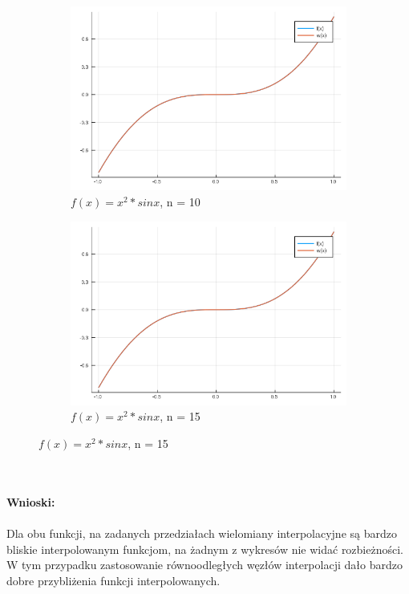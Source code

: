 \documentclass{article}
\begin{document}
\begin{figure}[ht]
	\begin{subfigure}{.5\textwidth}
		\centering
		\includegraphics[width=.8\linewidth]{plots/5_5.png}  
		\caption*{$f(x) = x^2*sinx$, n = 10}
	\end{subfigure}
	\begin{subfigure}{.5\textwidth}
		\centering
		\includegraphics[width=.8\linewidth]{plots/5_6.png}  
		\caption*{$f(x) = x^2*sinx$, n = 15}
	\end{subfigure}
\end{figure}\\\\
\newpage
\noindent \textbf{Wnioski: } \\\\
Dla obu funkcji, na zadanych przedziałach wielomiany interpolacyjne są bardzo bliskie interpolowanym funkcjom, na żadnym z wykresów nie widać rozbieżności. W tym przypadku zastosowanie równoodległych węzłów interpolacji dało bardzo dobre przybliżenia funkcji interpolowanych.
\end{document}
